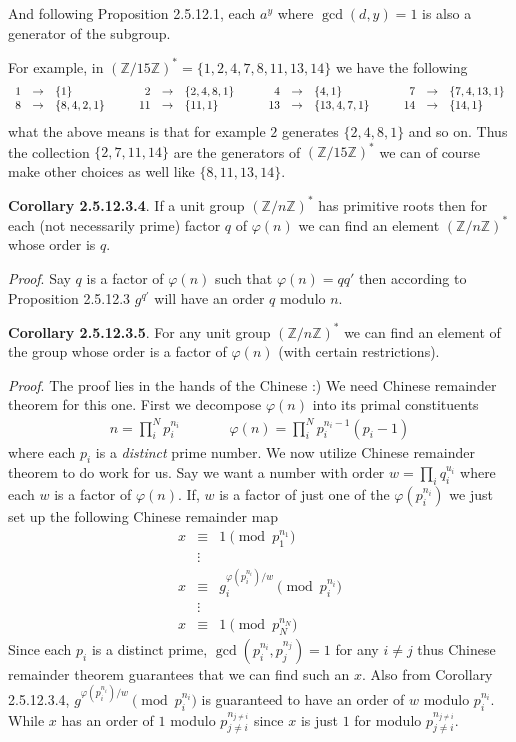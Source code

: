 \documentclass[aps,preprint,preprintnumbers,nofootinbib,showpacs,prd]{revtex4-1}
\newcommand{\ba}{\begin{array}}
\newcommand{\ea}{\end{array}}
\newcommand{\nbea}{\begin{eqnarray*}}
\newcommand{\neea}{\end{eqnarray*}}
\begin{document}
And following Proposition 2.5.12.1, each $a^y$ where $\gcd(d,y) = 1$ is also a generator of the subgroup.

For example, in $(\mathbb{Z}/15\mathbb{Z})^* = \{1, 2,4, 7, 8, 11, 13, 14\}$ we have the following
%
\nbea
\ba{r c l c r c l c r c l c r c l}
1 & \to & \{1\} & ~~~ & 2 & \to & \{2, 4, 8, 1\} & ~~~ & 4 & \to & \{4, 1\} & ~~~ &7 & \to & \{7, 4, 13, 1\} \\
8 & \to & \{8, 4, 2, 1\} & & 11 & \to & \{11, 1\} & & 13 & \to & \{13, 4, 7, 1\} & ~~~ & 14 & \to & \{14, 1\}
\ea
\neea
%
what the above means is that for example $2$ generates $\{2, 4, 8, 1\}$ and so on. Thus the collection $\{2, 7, 11, 14\}$ are the generators of $(\mathbb{Z}/15\mathbb{Z})^*$ we can of course make other choices as well like $\{8, 11, 13, 14\}$.

{\bf Corollary 2.5.12.3.4}. If a unit group $(\mathbb{Z}/n\mathbb{Z})^*$ has primitive roots then for each (not necessarily prime) factor $q$ of $\varphi(n)$ we can find an element $(\mathbb{Z}/n\mathbb{Z})^*$ whose order is $q$.

{\it Proof}. Say $q$ is a factor of $\varphi(n)$ such that $\varphi(n) = q q'$ then according to Proposition 2.5.12.3 $g^{q'}$ will have an order $q$ modulo $n$. 

{\bf Corollary 2.5.12.3.5}. For any unit group $(\mathbb{Z}/n\mathbb{Z})^*$ we can find an element of the group whose order is a factor of $\varphi(n)$ (with certain restrictions).

{\it Proof}. The proof lies in the hands of the Chinese :) We need Chinese remainder theorem for this one. First we decompose $\varphi(n)$ into its primal constituents
%
\nbea
n = \prod_i^{N} p_i^{n_i}  ~~~~~~~~~~~~~~~~ \varphi(n) = \prod_i^N p_i^{n_i  - 1} (p_i - 1)
\neea
%
where each $p_i$ is a {\it distinct} prime number. We now utilize Chinese remainder theorem to do work for us. Say we want a number with order $w=\prod_i q_i^{u_i}$ where each $w$ is a factor of $\varphi(n)$. If, $w$ is a factor of just one of the $\varphi(p_i^{n_i})$ we just set up the following Chinese remainder map 
%
\nbea
x & \equiv & 1 \pmod{p_1^{n_1}} \\
& \vdots & \\
x & \equiv & g_i^{\varphi(p_i^{n_i})/w} \pmod{p_i^{n_i}} \\
& \vdots & \\
x & \equiv & 1 \pmod{p_N^{n_N}}
\neea
%
Since each $p_i$ is a distinct prime, $\gcd(p_i^{n_i}, p_j^{n_j}) = 1$ for any $i\neq j$ thus Chinese remainder theorem guarantees that we can find such an $x$. Also from Corollary 2.5.12.3.4, $g^{\varphi(p_i^{n_i})/w} \pmod{p_i^{n_i}}$ is guaranteed to have an order of $w$ modulo $p_i^{n_i}$. While $x$ has an order of $1$ modulo $p_{j\neq i}^{n_{j\neq i}}$ since $x$ is just $1$ for modulo $p_{j\neq i}^{n_{j\neq i}}$.
\end{document}
